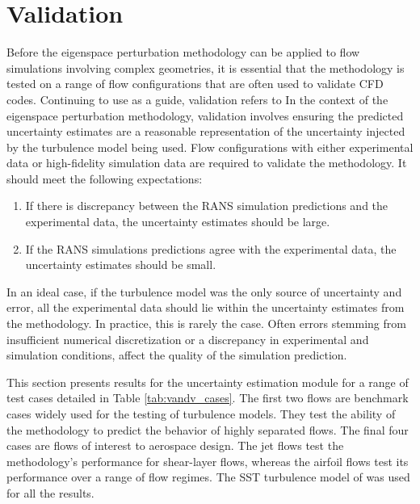 \section{Validation} \label{sec:VandV_rans_uq}

Before the eigenspace perturbation methodology can be applied to flow simulations involving complex geometries, it is essential that the methodology is tested on a range of flow configurations that are often used to validate CFD codes. Continuing to use \cite{computational_fluid_dynamics_committee_guide_1998} as a guide, validation refers to 
 In the context of the eigenspace perturbation methodology, validation involves ensuring the predicted uncertainty estimates are a reasonable representation of the uncertainty injected by the turbulence model being used. Flow configurations with either experimental data or high-fidelity simulation data are required to validate the methodology. It should meet the following expectations:

\begin{enumerate}
    \item If there is discrepancy between the RANS simulation predictions and the experimental data, the uncertainty estimates should be large.
    \item If the RANS simulations predictions agree with the experimental data, the uncertainty estimates should be small. 
\end{enumerate}

In an ideal case, if the turbulence model was the only source of uncertainty and error, all the experimental data should lie within the uncertainty estimates from the methodology. In practice, this is rarely the case. Often errors stemming from insufficient numerical discretization or a discrepancy in experimental and simulation conditions, affect the quality of the simulation prediction. 

This section presents results for the uncertainty estimation module for a range of test cases detailed in Table \ref{tab:vandv_cases}. The first two flows are benchmark cases widely used for the testing of turbulence models. They test the ability of the methodology to predict the behavior of highly separated flows. The final four cases are flows of interest to aerospace design. The jet flows test the methodology's performance for shear-layer flows, whereas the airfoil flows test its performance over a range of flow regimes. The SST turbulence model of \cite{sst} was used for all the results. 


